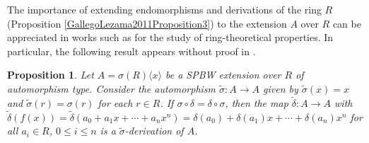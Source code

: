 \documentclass{amsart}
\newtheorem{proposition}[theorem]{Proposition}
\theoremstyle{definition}
\theoremstyle{remark}
\numberwithin{equation}{section}
\begin{document}
The importance of extending endomorphisms and derivations of the ring $R$ (Proposition \ref{GallegoLezama2011Proposition3}) to the extension $A$ over $R$ can be appreciated in works such as \cite{NasrMoussavi2008, ReyesSuarez2017} for the study of ring-theoretical properties. In particular, the following result appears without proof in \cite[p. 514]{NasrMoussavi2008}.

\begin{proposition}\label{extaautoSPBW1}
Let $A = \sigma(R)\langle x \rangle$ be a SPBW extension over $R$ of automorphism type. Consider the automorphism $\widetilde{\sigma}:A \rightarrow A$ given by $\widetilde{\sigma}(x) = x$ and $\widetilde{\sigma}(r)=\sigma(r)$ for each $r\in R$. If  $\sigma \circ \delta = \delta \circ \sigma$, then the map $\widetilde{\delta}:A\rightarrow A$ with $\widetilde{\delta}(f(x))=\widetilde{\delta}(a_0+a_1x+ \cdots +a_nx^n)=\delta(a_0)+\delta(a_1)x+ \cdots + \delta(a_n)x^n$ for all $a_i \in R$, $0\leq i\leq n$ is a $\widetilde{\sigma}$-derivation of $A$.
\end{proposition}
\end{document}
